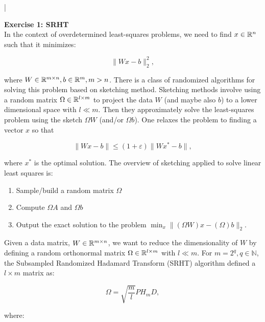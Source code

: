 \documentclass[11pt]{article}
\begin{document}
\lstset{frameround=fttt,language=Matlab}

\lstMakeShortInline[columns=fixed]|



{\bf{Exercise 1: SRHT}} \\

In the context of overdetermined least-squares problems, we need to find $x \in \mathbb{R}^n$ such that it minimizes:

\[ \|Wx - b\|_2^2, \]

where $W \in \mathbb{R}^{m \times n}, b \in \mathbb{R}^{m}, m > n$. There is a class of randomized algorithms for solving this problem based on sketching method. Sketching methods involve using a random matrix $\Omega \in \mathbb{R}^{l \times m}$ to project the data $W$ (and maybe also $b$) to a lower dimensional space with $l \ll m$. Then they approximately solve the least-squares problem using the sketch $\Omega W$ (and/or $\Omega b$).  One relaxes the problem to finding a vector $x$ so that 

\[ \|Wx - b\| \leq (1 + \varepsilon)\|Wx^* - b\|, \]

where $x^*$ is the optimal solution. The overview of sketching applied to solve linear least squares is:

\begin{enumerate}
    \item Sample/build a random matrix $\Omega$
    \item Compute $\Omega A$ and $\Omega b$
    \item Output the exact solution to the problem $\min_{x} \| (\Omega W)x - (\Omega) b\|_2$.
\end{enumerate}

Given a data matrix, $W \in \mathbb{R}^{m \times n}$, we want to reduce the dimensionality of $W$ by defining a random orthonormal matrix $\Omega \in \mathbb{R}^{l \times m}$ with $l \ll m$. For $m = 2^q, q \in \mathbb{N}$, the Subsampled Randomized Hadamard Transform (SRHT) algorithm defined a $l \times m$ matrix as:

\[ \Omega = \sqrt{\frac{m}{l}} PH_{m}D, \]

where:
\end{document}
